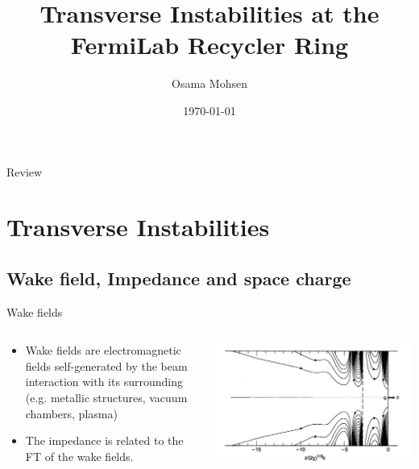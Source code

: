 \documentclass[xcolor=dvipsnames,18]{beamer}
\title[Transverse Instabilities at FNL ]{Transverse Instabilities at the FermiLab Recycler Ring}
\author[O.Mohsen]
{Osama Mohsen}
\institute[s]{test}
\date{\today}
\begin{document}
\begin{frame}
\titlepage
\end{frame}
\begin{frame}{Review}
    \tableofcontents
\end{frame}
\section{Transverse Instabilities}
\subsection{Wake field, Impedance and space charge}
\begin{frame}{Wake fields}
\begin{columns}[T] %
\begin{column}{.48\textwidth}
\begin{itemize}
    \item Wake fields are electromagnetic fields self-generated by the beam interaction with its surrounding (e.g. metallic structures, vacuum chambers, plasma) 
    \item The impedance is related to the FT of the wake fields. 
\end{itemize}
\end{column}%
\hfill%
\begin{column}{.48\textwidth}
\includegraphics[width=1\linewidth]{pic/Wake.png}
\end{column}%
\end{columns}
\end{frame}
\end{document}
